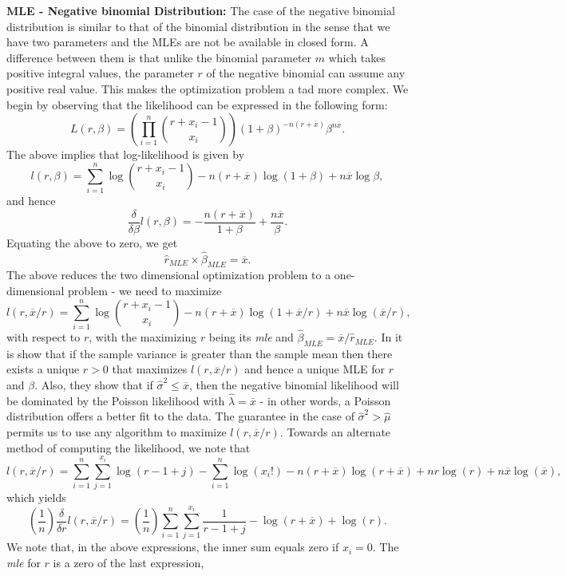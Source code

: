 \documentclass[]{book}
\theoremstyle{definition}
\theoremstyle{definition}
\theoremstyle{definition}
\theoremstyle{remark}
\begin{document}
\textbf{MLE - Negative binomial Distribution:} The case of the negative
binomial distribution is similar to that of the binomial distribution in
the sense that we have two parameters and the MLEs are not be available
in closed form. A difference between them is that unlike the binomial
parameter \(m\) which takes positive integral values, the parameter
\(r\) of the negative binomial can assume any positive real value. This
makes the optimization problem a tad more complex. We begin by observing
that the likelihood can be expressed in the following form: \[
L(r,\beta)=\left(\prod_{i=1}^n \binom{r+x_i-1}{x_i}\right) (1+\beta)^{-n(r+\overline{x})} \beta^{n\overline{x}}.  
\] The above implies that log-likelihood is given by \[
l(r,\beta)=\sum_{i=1}^n \log\binom{r+x_i-1}{x_i} -n(r+\overline{x}) \log(1+\beta) +n\overline{x}\log\beta,
\] and hence \[
\frac{\delta}{\delta\beta} l(r,\beta) = -\frac{n(r+\overline{x})}{1+\beta} + \frac{n\overline{x}}{\beta}.
\] Equating the above to zero, we get \[
\hat{r}_{MLE}\times \hat{\beta}_{MLE} = \overline{x}.
\] The above reduces the two dimensional optimization problem to a
one-dimensional problem - we need to maximize \[
l(r,\overline{x}/r)=\sum_{i=1}^n \log\binom{r+x_i-1}{x_i} -n(r+\overline{x}) \log(1+\overline{x}/r) +n\overline{x}\log(\overline{x}/r),
\] with respect to \(r\), with the maximizing \(r\) being its \emph{mle}
and \(\hat{\beta}_{MLE}=\overline{x}/\hat{r}_{MLE}\). In
\citep{levin1977} it is show that if the sample variance is greater than
the sample mean then there exists a unique \(r>0\) that maximizes
\(l(r,\overline{x}/r)\) and hence a unique MLE for \(r\) and \(\beta\).
Also, they show that if \(\hat{\sigma}^2\leq \overline{x}\), then the
negative binomial likelihood will be dominated by the Poisson likelihood
with \(\hat{\lambda}=\overline{x}\) - in other words, a Poisson
distribution offers a better fit to the data. The guarantee in the case
of \(\hat{\sigma}^2>\hat{\mu}\) permits us to use any algorithm to
maximize \(l(r,\overline{x}/r)\). Towards an alternate method of
computing the likelihood, we note that \[
l(r,\overline{x}/r)=\sum_{i=1}^n \sum_{j=1}^{x_i}\log(r-1+j) - \sum_{i=1}^n\log(x_i!) - n(r+\overline{x}) \log(r+\overline{x}) + nr\log(r) + n\overline{x}\log(\overline{x}),
\] which yields \[
\left(\frac{1}{n}\right)\frac{\delta}{\delta r}l(r,\overline{x}/r)=\left(\frac{1}{n}\right)\sum_{i=1}^n \sum_{j=1}^{x_i}\frac{1}{r-1+j} - \log(r+\overline{x}) + \log(r).
\] We note that, in the above expressions, the inner sum equals zero if
\(x_i=0\). The \emph{mle} for \(r\) is a zero of the last expression,
\end{document}
